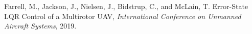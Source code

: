 

\begin{cventries}

      \begin{cvitems} %
      \item {\footnotesize{Farrell, M., Jackson, J., Nielsen, J., Bidstrup, C., and McLain,
            T. Error-State LQR Control of a Multirotor UAV,
          \textit{International Conference on Unmanned Aircraft Systems},
      2019.}}
      \end{cvitems}


\end{cventries}

